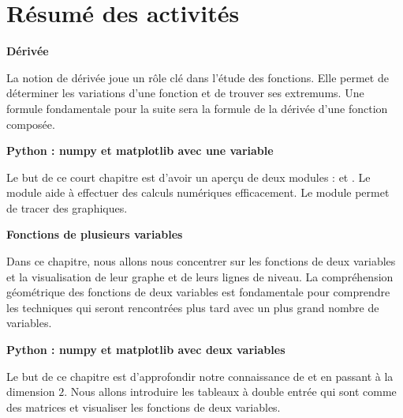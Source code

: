 

\cleardoublepage
\thispagestyle{empty}
\tableofcontents

\cleardoublepage
\section*{Résumé des activités}


\newcommand{\titrechapitre}[1]{{\textbf{#1}}\nopagebreak}
\newcommand{\descriptionchapitre}[1]{%
\smallskip\hfill
\begin{minipage}{0.95\textwidth}\small#1\end{minipage}\medskip\smallskip}

\titrechapitre{Dérivée}

\descriptionchapitre{La notion de dérivée joue un rôle clé dans l'étude des fonctions. Elle permet de déterminer les variations d'une fonction et de trouver ses extremums. Une formule fondamentale pour la suite sera la formule de la dérivée d'une fonction composée.}

\titrechapitre{Python : numpy et matplotlib avec une variable}

\descriptionchapitre{Le but de ce court chapitre est d'avoir un aperçu de deux modules \Python{} : \numpy{} et \matplotlib{}. Le module \numpy{} aide à effectuer des calculs numériques efficacement. Le module \matplotlib{} permet de tracer des graphiques.}

\titrechapitre{Fonctions de plusieurs variables}

\descriptionchapitre{Dans ce chapitre, nous allons nous concentrer sur les fonctions de deux variables et la visualisation de leur graphe et de leurs lignes de niveau. 
La compréhension géométrique des fonctions de deux variables est fondamentale pour comprendre les techniques qui seront rencontrées plus tard avec un plus grand nombre de variables.}

\titrechapitre{Python : numpy et matplotlib avec deux variables}

\descriptionchapitre{Le but de ce chapitre est d'approfondir notre connaissance de \numpy{} et \matplotlib{} en passant à la dimension $2$. Nous allons introduire les tableaux à double entrée qui sont comme des matrices et visualiser les fonctions de deux variables.}

